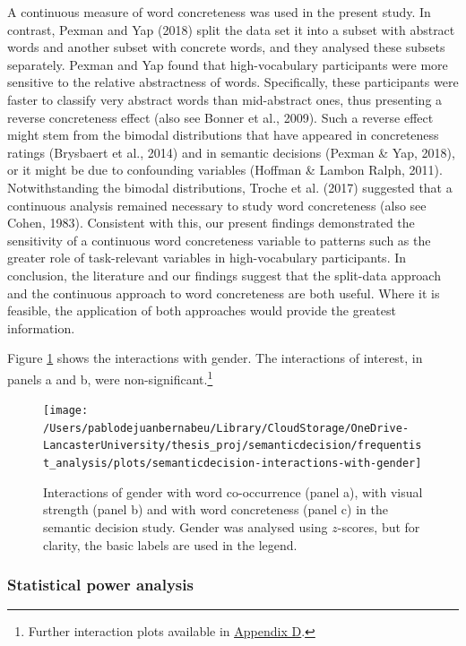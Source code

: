 \documentclass[
  12pt,
  man,floatsintext]{apa7}
\begin{document}
A continuous measure of word concreteness was used in the present study. In contrast, Pexman and Yap (2018) split the data set it into a subset with abstract words and another subset with concrete words, and they analysed these subsets separately. Pexman and Yap found that high-vocabulary participants were more sensitive to the relative abstractness of words. Specifically, these participants were faster to classify very abstract words than mid-abstract ones, thus presenting a reverse concreteness effect (also see Bonner et al., 2009). Such a reverse effect might stem from the bimodal distributions that have appeared in concreteness ratings (Brysbaert et al., 2014) and in semantic decisions (Pexman \& Yap, 2018), or it might be due to confounding variables (Hoffman \& Lambon Ralph, 2011). Notwithstanding the bimodal distributions, Troche et al. (2017) suggested that a continuous analysis remained necessary to study word concreteness (also see Cohen, 1983). Consistent with this, our present findings demonstrated the sensitivity of a continuous word concreteness variable to patterns such as the greater role of task-relevant variables in high-vocabulary participants. In conclusion, the literature and our findings suggest that the split-data approach and the continuous approach to word concreteness are both useful. Where it is feasible, the application of both approaches would provide the greatest information.

Figure \ref{fig:semanticdecision-interactions-with-gender} shows the interactions with gender. The interactions of interest, in panels a and b, were non-significant.\footnote{Further interaction plots available in \protect\hyperlink{appendix-D-interaction-plots}{\underline{Appendix D}}.}

\begin{figure}

{\centering \texttt{[image: /Users/pablodejuanbernabeu/Library/CloudStorage/OneDrive-LancasterUniversity/thesis\_proj/semanticdecision/frequentist\_analysis/plots/semanticdecision-interactions-with-gender]} 

}

\caption{Interactions of gender with word co-occurrence (panel a), with visual strength (panel b) and with word concreteness (panel c) in the semantic decision study. Gender was analysed using $z$-scores, but for clarity, the basic labels are used in the legend.}\label{fig:semanticdecision-interactions-with-gender}
\end{figure}

\hypertarget{statistical-power-analysis-4}{%
\subsubsection{Statistical power analysis}\label{statistical-power-analysis-4}}
\end{document}
